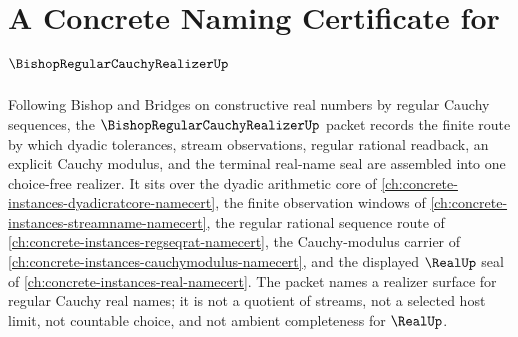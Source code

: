 \chapter{A Concrete Naming Certificate for $\BishopRegularCauchyRealizerUp$}
\label{ch:concrete-instances-bishop-regular-cauchy-realizer-namecert}

Following Bishop and Bridges on constructive real numbers by regular Cauchy sequences, the $\BishopRegularCauchyRealizerUp$ packet records the finite route by which dyadic tolerances, stream observations, regular rational readback, an explicit Cauchy modulus, and the terminal real-name seal are assembled into one choice-free realizer. It sits over the dyadic arithmetic core of \autoref{ch:concrete-instances-dyadicratcore-namecert}, the finite observation windows of \autoref{ch:concrete-instances-streamname-namecert}, the regular rational sequence route of \autoref{ch:concrete-instances-regseqrat-namecert}, the Cauchy-modulus carrier of \autoref{ch:concrete-instances-cauchymodulus-namecert}, and the displayed $\RealUp$ seal of \autoref{ch:concrete-instances-real-namecert}. The packet names a realizer surface for regular Cauchy real names; it is not a quotient of streams, not a selected host limit, not countable choice, and not ambient completeness for $\RealUp$.

